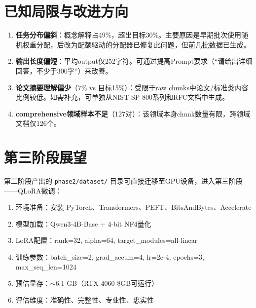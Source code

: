 \documentclass[12pt,a4paper]{ctexart}
\begin{document}
\section{已知局限与改进方向}

\begin{enumerate}[nosep]
    \item \textbf{任务分布偏斜}：概念解释占49\%，超出目标30\%。主要原因是早期批次使用随机权重分配，后改为配额驱动的分配器已修复此问题，但前几批数据已生成。
    \item \textbf{输出长度偏短}：平均output仅252字符。可通过提高Prompt要求（“请给出详细回答，不少于300字”）来改善。
    \item \textbf{论文摘要理解偏少}（7\% vs 目标15\%）：受限于raw chunks中论文/标准类内容比例较低。如需补充，可单独从NIST SP 800系列和RFC文档中生成。
    \item \textbf{comprehensive领域样本不足}（127对）：该领域本身chunk数量有限，跨领域文档仅126个。
\end{enumerate}

\section{第三阶段展望}

第二阶段产出的 \texttt{phase2/dataset/} 目录可直接迁移至GPU设备，进入第三阶段——QLoRA微调：

\begin{enumerate}[nosep]
    \item 环境准备：安装 PyTorch、Transformers、PEFT、BitsAndBytes、Accelerate
    \item 模型加载：Qwen3-4B-Base + 4-bit NF4量化
    \item LoRA配置：rank=32, alpha=64, target\_modules=all-linear
    \item 训练参数：batch\_size=2, grad\_accum=4, lr=2e-4, epochs=3, max\_seq\_len=1024
    \item 预估显存：$\sim$6.1 GB（RTX 4060 8GB可运行）
    \item 评估维度：准确性、完整性、专业性、忠实性
\end{enumerate}
\end{document}
